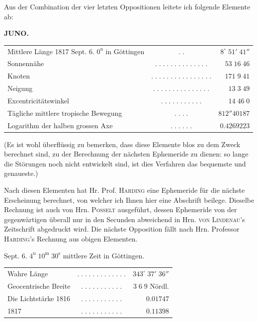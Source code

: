 \par\indent Aus der Combination der vier letzten Oppositionen leitete ich folgende Elemente ab:
\par
\clearpage
\thispagestyle{empty}
\noindent{}%
\makebox[12mm][l]{}%
\parbox[t]{\dimexpr\linewidth-24mm\relax}{\centering\footnotesize\bfseries JUNO.\par}%
\par\nobreak\medskip
\begin{center}\fontsize{9}{11}\selectfont\setlength{\tabcolsep}{2pt}\renewcommand{\arraystretch}{1.15}\begin{tabular}{lcr}
Mittlere Länge 1817 Sept. 6. $0^{\mathrm u}$ in Göttingen & $.\;.$ & $8^\circ\;51'\;41''$\\
Sonnennähe & $.\;.\;.\;.\;.\;.\;.\;.\;.\;.\;.\;.\;.\;.$ & $53\;16\;46$\\
Knoten & $.\;.\;.\;.\;.\;.\;.\;.\;.\;.\;.\;.\;.\;.\;.\;.$ & $171\;9\;41$\\
Neigung & $.\;.\;.\;.\;.\;.\;.\;.\;.\;.\;.\;.\;.\;.\;.$ & $13\;3\;49$\\
Excentricitätswinkel & $.\;.\;.\;.\;.\;.\;.\;.\;.\;.\;.$ & $14\;46\;0$\\
Tägliche mittlere tropische Bewegung & $.\;.\;.\;.$ & $812''40187$\\
Logarithm der halben grossen Axe & $.\;.\;.\;.\;.\;.$ & $0.4269223$\\
\end{tabular}\end{center}

\par\indent (Es ist wohl überflüssig zu bemerken, dass diese Elemente blos zu dem Zweck berechnet sind, zu der Berechnung der nächsten Ephemeride zu dienen: so lange die Störungen noch nicht entwickelt sind, ist dies Verfahren das bequemste und genaueste.)
\par\indent Nach diesen Elementen hat Hr. Prof. \textsc{Harding} eine Ephemeride für die nächste Erscheinung berechnet, von welcher ich Ihnen hier eine Abschrift beilege. Dieselbe Rechnung ist auch von Hrn. \textsc{Posselt} ausgeführt, dessen Ephemeride von der gegenwärtigen überall nur in den Secunden abweichend in Hrn. \textsc{von Lindenau}'s Zeitschrift abgedruckt wird. Die nächste Opposition fällt nach Hrn. Professor \textsc{Harding}'s Rechnung aus obigen Elementen.
\begin{center}\fontsize{10}{12} Sept. 6. $4^{\mathrm u}\;10^{\mathrm m}\;30^{\mathrm s}$ mittlere Zeit in Göttingen.\par
\setlength{\tabcolsep}{3pt}\begin{tabular}{lcr}
Wahre Länge & $.\;.\;.\;.\;.\;.\;.\;.\;.\;.\;.\;.\;.$ & $343^\circ\;37'\;36''$\\
Geocentrische Breite & $.\;.\;.\;.\;.\;.\;.\;.\;.\;.\;.$ & $3\;6\;9$ Nördl.\\
Die Lichtstärke 1816 & $.\;.\;.\;.\;.\;.\;.\;.\;.\;.\;.$ & $0.01747$\\
\hfill1817 & $.\;.\;.\;.\;.\;.\;.\;.\;.\;.\;.$ & $0.11398$\\
\end{tabular}\end{center}


